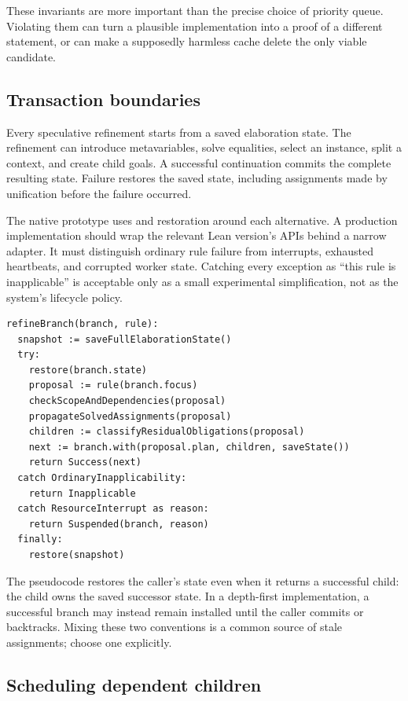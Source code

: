 \documentclass[11pt,letterpaper]{article}
\newcommand{\code}[1]{\texttt{\detokenize{#1}}}
\theoremstyle{definition}
\theoremstyle{remark}
\begin{document}
These invariants are more important than the precise choice of priority queue. Violating them can turn a plausible implementation into a proof of a different statement, or can make a supposedly harmless cache delete the only viable candidate.

\subsection{Transaction boundaries}

Every speculative refinement starts from a saved elaboration state. The refinement can introduce metavariables, solve equalities, select an instance, split a context, and create child goals. A successful continuation commits the complete resulting state. Failure restores the saved state, including assignments made by unification before the failure occurred.

The native prototype uses \code{Tactic.saveState} and restoration around each alternative. A production implementation should wrap the relevant Lean version's APIs behind a narrow adapter. It must distinguish ordinary rule failure from interrupts, exhausted heartbeats, and corrupted worker state. Catching every exception as ``this rule is inapplicable'' is acceptable only as a small experimental simplification, not as the system's lifecycle policy.

\Needspace{240pt}
\begin{lstlisting}[caption={Transactional refinement over coupled obligations. Pseudocode.}]
refineBranch(branch, rule):
  snapshot := saveFullElaborationState()
  try:
    restore(branch.state)
    proposal := rule(branch.focus)
    checkScopeAndDependencies(proposal)
    propagateSolvedAssignments(proposal)
    children := classifyResidualObligations(proposal)
    next := branch.with(proposal.plan, children, saveState())
    return Success(next)
  catch OrdinaryInapplicability:
    return Inapplicable
  catch ResourceInterrupt as reason:
    return Suspended(branch, reason)
  finally:
    restore(snapshot)
\end{lstlisting}

The pseudocode restores the caller's state even when it returns a successful child: the child owns the saved successor state. In a depth-first implementation, a successful branch may instead remain installed until the caller commits or backtracks. Mixing these two conventions is a common source of stale assignments; choose one explicitly.

\subsection{Scheduling dependent children}
\end{document}
